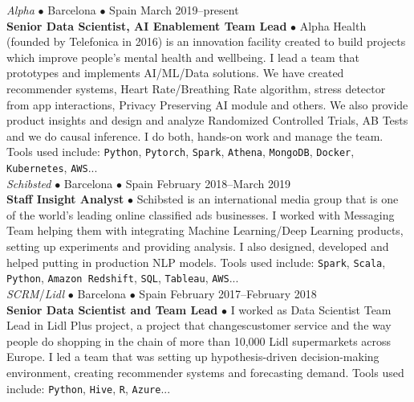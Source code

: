 \documentclass[a4paper, oneside]{scrreprt}
\begin{document}
\vspace{0.2cm}

\noindent{}
\hspace{-0.15cm}\textit{Alpha} $\bullet$
Barcelona $\bullet$ Spain \hfill March 2019--present\\
\noindent\textbf{\small Senior Data Scientist, AI Enablement Team Lead} $\bullet$ 
{\small Alpha Health (founded by Telefonica in 2016) is an innovation facility created to build
  projects which improve people's mental health and wellbeing.  I lead a team that prototypes and
  implements AI/ML/Data solutions. We have created recommender systems, Heart Rate/Breathing Rate
  algorithm, stress detector from app interactions, Privacy Preserving AI module and others. We also
  provide product insights and design and analyze Randomized Controlled Trials, AB Tests and we do
  causal inference. I do both, hands-on work and manage the team.  Tools used include:
  \texttt{Python}, \texttt{Pytorch}, \texttt{Spark}, \texttt{Athena}, \texttt{MongoDB},
  \texttt{Docker}, \texttt{Kubernetes}, \texttt{AWS}... }\\

\vspace{-0.3cm}
\noindent{}
\hspace{-0.15cm}\textit{Schibsted} $\bullet$ 
Barcelona $\bullet$ Spain \hfill February 2018--March 2019\\
\noindent\textbf{\small Staff Insight Analyst } $\bullet$ 
{\small Schibsted is an international media group that is one of the world’s leading online
  classified ads businesses.  I worked with Messaging Team helping them with integrating Machine
  Learning/Deep Learning products, setting up experiments and providing analysis. I also designed,
  developed and helped putting in production NLP models. Tools used include: \texttt{Spark},
  \texttt{Scala}, \texttt{Python}, \texttt{Amazon Redshift}, \texttt{SQL}, \texttt{Tableau}, \texttt{AWS}... }\\

\vspace{-0.3cm}
\noindent{}\textit{SCRM}/\textit{Lidl} $\bullet$ 
Barcelona $\bullet$ Spain \hfill February 2017--February 2018\\
\noindent\textbf{\small Senior Data Scientist and Team Lead} $\bullet$ 
{\small I worked as Data Scientist Team Lead in Lidl Plus project, a project that changescustomer
  service and the way people do shopping in the chain of more than 10,000 Lidl supermarkets across
  Europe. I led a team that was setting up hypothesis-driven decision-making environment, creating
  recommender systems and forecasting demand. Tools used include: \texttt{Python}, \texttt{Hive},
  \texttt{R}, \texttt{Azure}...}\\
\end{document}
